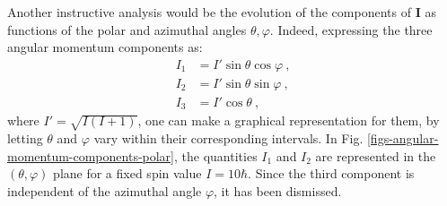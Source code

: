 Another instructive analysis would be the evolution of the components of $\mathbf{I}$ as functions of the polar and azimuthal angles $\theta,\varphi$. Indeed, expressing the three angular momentum components as:
\begin{align}
    I_1&=I'\sin\theta\cos\varphi\ ,\\
    I_2&=I'\sin\theta\sin\varphi\ ,\\
    I_3&=I'\cos\theta\ ,
    \label{angular-momentum-polar-components}
\end{align}
where $I'=\sqrt{I(I+1)}$, one can make a graphical representation for them, by letting $\theta$ and $\varphi$ vary within their corresponding intervals. In Fig. \ref{figs-angular-momentum-components-polar}, the quantities $I_1$ and $I_2$ are represented in the $(\theta,\varphi)$ plane for a fixed spin value $I=10\hbar$. Since the third component is independent of the azimuthal angle $\varphi$, it has been dismissed.

